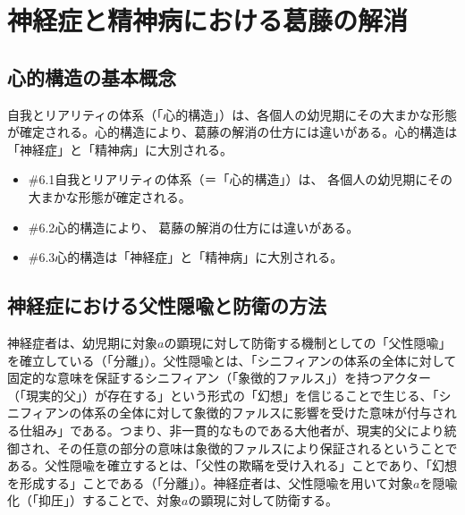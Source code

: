 \section{神経症と精神病における葛藤の解消}\label{ux795eux7d4cux75c7ux3068ux7cbeux795eux75c5ux306bux304aux3051ux308bux845bux85e4ux306eux89e3ux6d88}

\subsection{心的構造の基本概念}\label{ux5fc3ux7684ux69cbux9020ux306eux57faux672cux6982ux5ff5}

自我とリアリティの体系（「心的構造」）は、各個人の幼児期にその大まかな形態が確定される。心的構造により、葛藤の解消の仕方には違いがある。心的構造は「神経症」と「精神病」に大別される。

\begin{note}{}
  \begin{itemize}
    \tightlist
    \item{\#6.1}自我とリアリティの体系（＝「心的構造」）は、  各個人の幼児期にその大まかな形態が確定される。
    \item{\#6.2}心的構造により、  葛藤の解消の仕方には違いがある。
    \item{\#6.3}心的構造は「神経症」と「精神病」に大別される。
  \end{itemize}
\end{note}

\subsection{神経症における父性隠喩と防衛の方法}\label{ux795eux7d4cux75c7ux306bux304aux3051ux308bux7236ux6027ux96a0ux55a9ux3068ux9632ux885bux306eux65b9ux6cd5}

神経症者は、幼児期に対象\(a\)の顕現に対して防衛する機制としての「父性隠喩」を確立している（「分離」）。父性隠喩とは、「シニフィアンの体系の全体に対して固定的な意味を保証するシニフィアン（「象徴的ファルス」）を持つアクター（「現実的父」）が存在する」という形式の「幻想」を信じることで生じる、「シニフィアンの体系の全体に対して象徴的ファルスに影響を受けた意味が付与される仕組み」である。つまり、非一貫的なものである大他者が、現実的父により統御され、その任意の部分の意味は象徴的ファルスにより保証されるということである。父性隠喩を確立するとは、「父性の欺瞞を受け入れる」ことであり、「幻想を形成する」ことである（「分離」）。神経症者は、父性隠喩を用いて対象\(a\)を隠喩化（「抑圧」）することで、対象\(a\)の顕現に対して防衛する。

